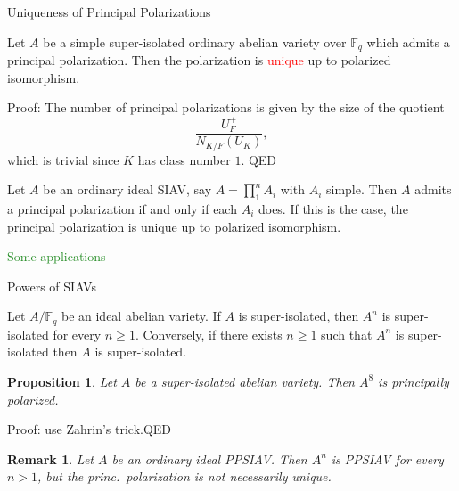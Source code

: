 \documentclass[usenames,dvipsnames,handout]{beamer}
\def\F{\mathbb{F}}
\newcommand{\red}[1]{\textcolor{red}{#1}}
\newcommand{\green}[1]{\textcolor{ForestGreen}{#1}}
\newtheorem{remark}[df]{Remark}
\newtheorem{proposition}[df]{Proposition}
\begin{document}
\begin{frame}{ Uniqueness of Principal Polarizations }
	\pause 
	\begin{theorem}
	  Let $A$ be a simple super-isolated ordinary abelian variety over $\F_q$ which admits a principal polarization.
	  Then the polarization is \red{unique} up to polarized isomorphism.
	\end{theorem}
	\pause Proof: 
	The number of principal polarizations is given by the size of the quotient
	  \[
	    \frac{ U_{F}^+ }{ N_{K/F}(U_K) },
	  \]
	which is trivial since $K$ has class number $1$. \qquad QED
	\pause
    \begin{corollary}
	  Let $A$ be an ordinary ideal SIAV, say $A=\prod_{1}^n A_i$ with $A_i$ simple.
	  Then $A$ admits a principal polarization if and only if each $A_i$ does.
	  If this is the case, the principal polarization is unique up to polarized isomorphism.
	\end{corollary}
\end{frame}

\begin{frame}{ }
    \begin{center}
    \green{\huge Some applications }
    \end{center}
\end{frame}

\begin{frame}{ Powers of SIAVs }
    \pause
    \begin{theorem}\label{thm:powers}
	  Let $A/\F_q$ be an ideal abelian variety.
	  If $A$ is super-isolated, then $A^n$ is super-isolated for every $n\geq 1$.
	  Conversely, if there exists $n\geq 1$ such that $A^n$ is super-isolated then $A$ is super-isolated.
	\end{theorem}
	\pause
	\begin{proposition}
	  Let $A$ be a super-isolated abelian variety.
	  Then $A^8$ is principally polarized.
	\end{proposition}
	Proof: use Zahrin's trick.\qquad QED
	\pause
	\begin{remark}
	  Let $A$ be an ordinary ideal PPSIAV.
	  Then $A^n$ is PPSIAV for every $n>1$, but the princ.~polarization is not necessarily unique.
	\end{remark}
\end{frame}
\end{document}
